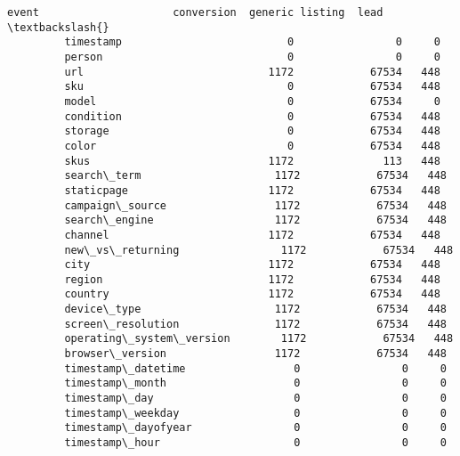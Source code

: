 \documentclass[11pt]{article}
\begin{document}
\begin{Verbatim}[commandchars=\\\{\}]
         event                     conversion  generic listing  lead  \textbackslash{}
         timestamp                          0                0     0   
         person                             0                0     0   
         url                             1172            67534   448   
         sku                                0            67534   448   
         model                              0            67534     0   
         condition                          0            67534   448   
         storage                            0            67534   448   
         color                              0            67534   448   
         skus                            1172              113   448   
         search\_term                     1172            67534   448   
         staticpage                      1172            67534   448   
         campaign\_source                 1172            67534   448   
         search\_engine                   1172            67534   448   
         channel                         1172            67534   448   
         new\_vs\_returning                1172            67534   448   
         city                            1172            67534   448   
         region                          1172            67534   448   
         country                         1172            67534   448   
         device\_type                     1172            67534   448   
         screen\_resolution               1172            67534   448   
         operating\_system\_version        1172            67534   448   
         browser\_version                 1172            67534   448   
         timestamp\_datetime                 0                0     0   
         timestamp\_month                    0                0     0   
         timestamp\_day                      0                0     0   
         timestamp\_weekday                  0                0     0   
         timestamp\_dayofyear                0                0     0   
         timestamp\_hour                     0                0     0   
         

\end{Verbatim}
\end{document}
